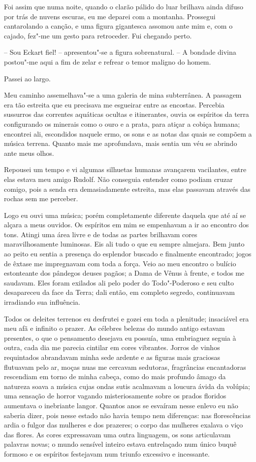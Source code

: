 Foi assim que numa noite, quando o clarão pálido do luar brilhava ainda
difuso por trás de nuvens escuras, eu me deparei com a montanha.
Prossegui cantarolando a canção, e uma figura gigantesca assomou ante
mim e, com o cajado, fez"-me um gesto para retroceder. Fui chegando perto.

 -- Sou Eckart fiel! -- apresentou"-se a figura sobrenatural. -- A bondade
divina postou"-me aqui a fim de zelar e refrear o temor maligno do
homem.

Passei ao largo.

Meu caminho assemelhava"-se a uma galeria de mina subterrânea. A passagem
era tão estreita que eu precisava me esgueirar entre as encostas.
Percebia sussurros das correntes aquáticas ocultas e itinerantes, ouvia
os espíritos da terra configurando os minerais como o ouro e a prata,
para atiçar a cobiça humana; encontrei ali, escondidos naquele ermo, os
sons e as notas das quais se compõem a música terrena. Quanto mais me
aprofundava, mais sentia um véu se abrindo ante meus olhos.

Repousei um tempo e vi algumas silhuetas humanas avançarem vacilantes,
entre elas estava meu amigo Rudolf. Não conseguia entender como podiam
cruzar comigo, pois a senda era demasiadamente estreita, mas elas
passavam através das rochas sem me perceber.

Logo eu ouvi uma música; porém completamente diferente daquela que até
aí se alçara a meus ouvidos. Os espíritos em mim se empenhavam a ir ao
encontro dos tons. Atingi uma área livre e de todas as partes brilhavam
cores maravilhosamente luminosas. Eis ali tudo o que eu sempre
almejara. Bem junto ao peito eu sentia a presença do esplendor buscado
e finalmente encontrado; jogos de êxtase me impregnavam com toda a
força. Veio ao meu encontro o bulício estonteante dos pândegos deuses
pagãos; a Dama de Vênus à frente, e todos me saudavam. Eles foram
exilados ali pelo poder do Todo"-Poderoso e seu culto desapareceu da
face da Terra; dali então, em completo segredo, continuavam irradiando
sua influência.

Todos os deleites terrenos eu desfrutei e gozei em toda a plenitude;
insaciável era meu afã e infinito o prazer. As célebres belezas do
mundo antigo estavam presentes, o que o pensamento desejava eu possuía,
uma embriaguez seguia à outra, cada dia me parecia cintilar em cores
vibrantes. Jorros de vinhos requintados abrandavam minha sede ardente e
as figuras mais graciosas flutuavam pelo ar, moças nuas me cercavam
sedutoras, fragrâncias encantadoras rescendiam em torno de minha
cabeça, como do mais profundo âmago da natureza soava a música cujas
ondas sutis acalmavam a loucura ávida da volúpia; uma sensação de
horror vagando misteriosamente sobre os prados floridos aumentava o
inebriante langor. Quantos anos se esvaíram nesse enlevo eu não saberia
dizer, pois nesse estado não havia tempo nem diferenças: nas
florescências ardia o fulgor das mulheres e dos prazeres; o corpo das
mulheres exalava o viço das flores. As cores expressavam uma outra
linguagem, os sons articulavam palavras novas; o mundo sensível inteiro
estava entrelaçado num único buquê \mbox{formoso} e os espíritos festejavam
num triunfo excessivo e incessante.

